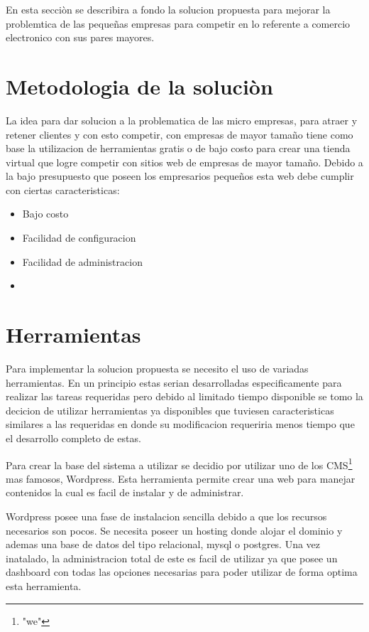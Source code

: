 En esta secciòn se describira a fondo la solucion propuesta para mejorar la problemtica de las pequeñas
empresas para competir en lo referente a comercio electronico con sus pares mayores.

\section{Metodologia de la soluciòn}

La idea para dar solucion a la problematica de las micro empresas, para atraer y retener clientes y
con esto competir, con empresas de mayor tamaño tiene como base la utilizacion de herramientas gratis
o de bajo costo para crear una tienda virtual que logre competir con sitios web de empresas de mayor
tamaño. Debido a la bajo presupuesto que poseen los empresarios pequeños esta web debe cumplir con 
ciertas caracteristicas:

\begin{itemize}

\item Bajo costo
\item Facilidad de configuracion
\item Facilidad de administracion
\item 

\end{itemize}
\section{Herramientas}

Para implementar la solucion propuesta se necesito el uso de variadas herramientas. En un principio estas
serian desarrolladas especificamente para realizar las tareas requeridas pero debido al limitado tiempo
disponible se tomo la decicion de utilizar herramientas ya disponibles que tuviesen caracteristicas
similares a las requeridas en donde su modificacion requeriria menos tiempo que el desarrollo completo
de estas.

Para crear la base del sistema a utilizar se decidio por utilizar uno de los CMS\footnote{"we"} mas 
famosos, Wordpress. Esta herramienta permite crear una web para manejar contenidos la cual es facil
de instalar y de administrar. 

Wordpress posee una fase de instalacion sencilla debido a que los recursos necesarios son pocos. Se 
necesita poseer un hosting donde alojar el dominio y ademas una base de datos del tipo relacional, mysql
o postgres. Una vez inatalado, la administracion total de este es facil de utilizar ya que posee un
dashboard con todas las opciones necesarias para poder utilizar de forma optima esta herramienta. 

